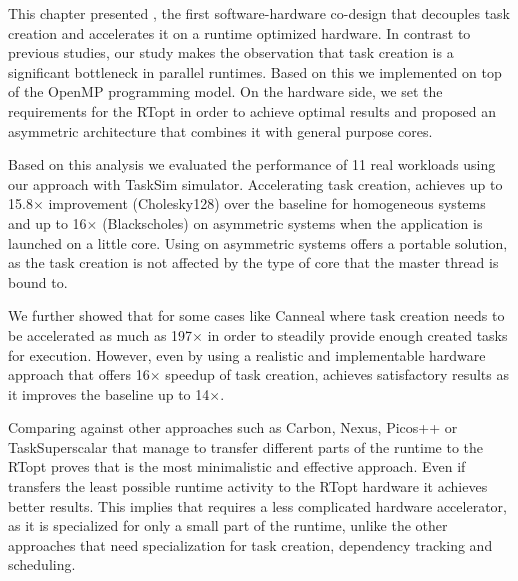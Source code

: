 This chapter presented {\proposal}, the first software-hardware co-design that decouples task creation and accelerates it on a runtime optimized hardware.
In contrast to previous studies, our study makes the observation that task creation is a significant bottleneck in parallel runtimes.
Based on this we implemented {\proposal} on top of the OpenMP programming model.
On the hardware side, we set the requirements for the RTopt in order to achieve optimal results and proposed an asymmetric architecture that combines it with general purpose cores.

Based on this analysis we evaluated the performance of 11 real workloads using our approach with TaskSim simulator.
Accelerating task creation, {\proposal} achieves up to 15.8$\times$ improvement (Cholesky128) over the baseline for homogeneous systems and up to 16$\times$ (Blackscholes) on asymmetric systems when the application is launched on a little core.
Using {\proposal} on asymmetric systems offers a portable solution, as the task creation is not affected by the type of core that the master thread is bound to. 


We further showed that for some cases like Canneal where task creation needs to be accelerated as much as 197$\times$ in order to steadily provide enough created tasks for execution.
However, even by using a realistic and implementable hardware approach that offers 16$\times$ speedup of task creation, achieves satisfactory results as it improves the baseline up to 14$\times$.

Comparing {\proposal} against other approaches such as Carbon, Nexus, Picos++ or TaskSuperscalar that manage to transfer different parts of the runtime to the RTopt proves that {\proposal} is the most minimalistic and effective approach.
Even if {\proposal} transfers the least possible runtime activity to the RTopt hardware it achieves better results.
This implies that {\proposal} requires a less complicated hardware accelerator, as it is specialized for only a small part of the runtime, unlike the other approaches that need specialization for task creation, dependency tracking and scheduling.



